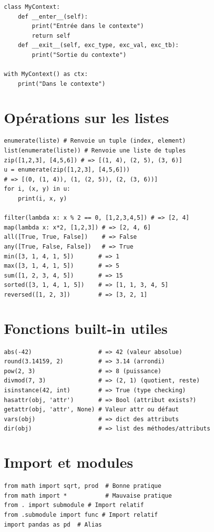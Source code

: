 \documentclass{article}
\begin{document}
\begin{multicols*}{4}
\begin{lstlisting}
class MyContext:
    def __enter__(self):
        print("Entrée dans le contexte")
        return self
    def __exit__(self, exc_type, exc_val, exc_tb):
        print("Sortie du contexte")

with MyContext() as ctx:
    print("Dans le contexte")
\end{lstlisting}

\section*{Opérations sur les listes}
\begin{lstlisting}
enumerate(liste) # Renvoie un tuple (index, element)
list(enumerate(liste)) # Renvoie une liste de tuples
zip([1,2,3], [4,5,6]) # => [(1, 4), (2, 5), (3, 6)]
u = enumerate(zip([1,2,3], [4,5,6]))
# => [(0, (1, 4)), (1, (2, 5)), (2, (3, 6))]
for i, (x, y) in u:
    print(i, x, y)

filter(lambda x: x % 2 == 0, [1,2,3,4,5]) # => [2, 4]
map(lambda x: x*2, [1,2,3]) # => [2, 4, 6]
all([True, True, False])    # => False
any([True, False, False])   # => True
min([3, 1, 4, 1, 5])       # => 1
max([3, 1, 4, 1, 5])       # => 5
sum([1, 2, 3, 4, 5])       # => 15
sorted([3, 1, 4, 1, 5])    # => [1, 1, 3, 4, 5]
reversed([1, 2, 3])        # => [3, 2, 1]
\end{lstlisting}

\section*{Fonctions built-in utiles}
\begin{lstlisting}
abs(-42)                   # => 42 (valeur absolue)
round(3.14159, 2)          # => 3.14 (arrondi)
pow(2, 3)                  # => 8 (puissance)
divmod(7, 3)               # => (2, 1) (quotient, reste)
isinstance(42, int)        # => True (type checking)
hasattr(obj, 'attr')       # => Bool (attribut exists?)
getattr(obj, 'attr', None) # Valeur attr ou défaut
vars(obj)                  # => dict des attributs
dir(obj)                   # => list des méthodes/attributs
\end{lstlisting}

\section*{Import et modules}
\begin{lstlisting}
from math import sqrt, prod  # Bonne pratique
from math import *           # Mauvaise pratique
from . import submodule # Import relatif
from .submodule import func # Import relatif
import pandas as pd  # Alias


\end{lstlisting}
\end{multicols*}
\end{document}
